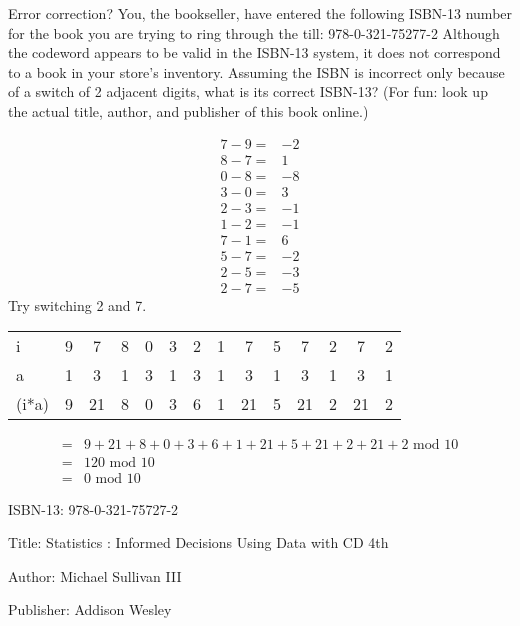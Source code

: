 \begin{question}{2} %
Error correction? You, the bookseller, have entered the following ISBN-13 number for
the book you are trying to ring through the till:
978-0-321-75277-2
Although the codeword appears to be valid in the ISBN-13 system, it does not correspond
to a book in your store's inventory. Assuming the ISBN is incorrect only because of a switch
of 2 adjacent digits, what is its correct ISBN-13?
(For fun: look up the actual title, author, and publisher of this book online.)

\begin{align*}
7-9 =&-2\\
8-7 =& 1\\
0-8 =& -8\\
3-0=&3\\
2-3=&-1\\
1-2=&-1\\
7-1=&6\\
5-7=&-2\\
2-5=&-3\\
2-7=&-5
\end{align*}
Try switching 2 and 7.

\begin{tabular}{l|ccccccccccccc}
\hline
i     & 9  & 7  & 8  & 0  & 3  & 2  & 1  & 7  & 5  & 7 & 2 & 7 & 2\\
a     & 1  & 3  & 1  & 3  & 1  & 3  & 1  & 3  & 1  & 3 & 1 & 3 & 1 \\ 
\hline
(i*a) & 9  & 21 & 8  & 0  & 3  & 6  & 1  & 21 & 5  & 21& 2 &21 & 2
\end{tabular}

\begin{align*}
=& 9  + 21 + 8  + 0  + 3  + 6  + 1  + 21 + 5  + 21+ 2 +21 + 2 \textrm{ mod } 10\\
=& 120 \textrm{ mod } 10\\
=& 0 \textrm{ mod } 10
\end{align*}

ISBN-13: 978-0-321-75727-2

Title: Statistics : Informed Decisions Using Data with CD 4th

Author: Michael Sullivan III

Publisher: Addison Wesley

\end{question}


